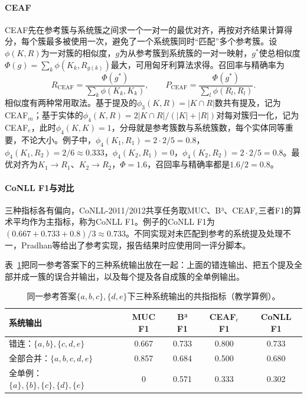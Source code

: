 \paragraph{CEAF}
CEAF先在参考簇与系统簇之间求一个一对一的最优对齐，再按对齐结果计算得分，每个簇最多被使用一次，避免了一个系统簇同时“匹配”多个参考簇。设$\phi(K,R)$为一对簇的相似度，$g$为从参考簇到系统簇的一对一映射，$g^*$使总相似度$\Phi(g)=\sum_k\phi(K_k,R_{g(k)})$最大，可用匈牙利算法求得。召回率与精确率为
\begin{equation}
  R_{\mathrm{CEAF}}=\frac{\Phi(g^*)}{\sum_k\phi(K_k,K_k)},\qquad
  P_{\mathrm{CEAF}}=\frac{\Phi(g^*)}{\sum_l\phi(R_l,R_l)}.
  \label{eq:nlp-analysis-ceaf}
\end{equation}
相似度有两种常用取法。基于提及的$\phi_3(K,R)=|K\cap R|$数共有提及，记为CEAF$_m$；基于实体的$\phi_4(K,R)=2|K\cap R|/(|K|+|R|)$对每对簇归一化，记为CEAF$_e$，此时$\phi_4(K,K)=1$，分母就是参考簇数与系统簇数，每个实体同等重要，不论大小。例子中，$\phi_4(K_1,R_1)=2\cdot2/5=0.8$，$\phi_4(K_1,R_2)=2/6\approx0.333$，$\phi_4(K_2,R_1)=0$，$\phi_4(K_2,R_2)=2\cdot2/5=0.8$。最优对齐为$K_1\to R_1$、$K_2\to R_2$，$\Phi=1.6$，召回率与精确率都是$1.6/2=0.8$。

\paragraph{CoNLL F1与对比}
三种指标各有偏向，CoNLL-2011/2012共享任务取MUC、B³、CEAF$_e$三者F1的算术平均作为主指标，称为CoNLL F1。例子的CoNLL F1为$(0.667+0.733+0.8)/3\approx0.733$。不同实现对未匹配到参考的系统提及处理不一，Pradhan等给出了参考实现，报告结果时应使用同一评分脚本。

表~\ref{tab:nlp-analysis-coreference-metrics}把同一参考答案下的三种系统输出放在一起：上面的错连输出、把五个提及全部并成一簇的误合并输出，以及每个提及各自成簇的全单例输出。

\begin{table}[htbp]
  \centering
  \small
  \begin{tabular}{@{}lcccc@{}}
    \toprule
    系统输出 & MUC F1 & B³ F1 & CEAF$_e$ F1 & CoNLL F1\\
    \midrule
    错连：$\{a,b\},\{c,d,e\}$ & 0.667 & 0.733 & 0.800 & 0.733\\
    全部合并：$\{a,b,c,d,e\}$ & 0.857 & 0.684 & 0.500 & 0.680\\
    全单例：$\{a\},\{b\},\{c\},\{d\},\{e\}$ & 0 & 0.571 & 0.333 & 0.302\\
    \bottomrule
  \end{tabular}
  \caption{同一参考答案$\{a,b,c\},\{d,e\}$下三种系统输出的共指指标（教学算例）。}
  \label{tab:nlp-analysis-coreference-metrics}
\end{table}

